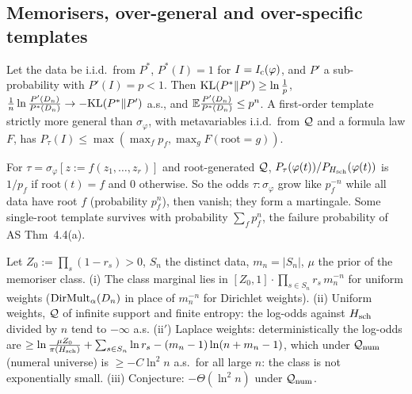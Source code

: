\subsection{Memorisers, over-general and over-specific templates}\label{sec:univ:memo}

\begin{theorem}\label{thm:univ:size}
Let the data be i.i.d.\ from $P^*$, $P^*(I)=1$ for $I=I_{\mathrm{c}}(\varphi)$, and $P'$ a sub-probability with $P'(I)=p<1$. Then $\mathrm{KL}(P^*\|P')\ge\ln\frac1p$, $\frac1n\ln\frac{P'(D_n)}{P^*(D_n)}\to-\mathrm{KL}(P^*\|P')$ a.s., and $\mathbb{E}\frac{P'(D_n)}{P^*(D_n)}\le p^n$. A first-order template strictly more general than $\sigma_\varphi$, with metavariables i.i.d.\ from $\mathcal{Q}$ and a formula law $F$, has $P_\tau(I)\le\max(\max_fp_f,\max_gF(\mathrm{root}=g))$.
\end{theorem}

\begin{proposition}\label{prop:univ:overspec}
For $\tau=\sigma_\varphi[z:=f(z_1,\dots,z_r)]$ and root-generated $\mathcal{Q}$, $P_\tau(\varphi(t))/P_{H_{\mathrm{sch}}}(\varphi(t))$ is $1/p_f$ if $\mathrm{root}(t)=f$ and $0$ otherwise. So the odds $\tau:\sigma_\varphi$ grow like $p_f^{-n}$ while all data have root $f$ (probability $p_f^n$), then vanish; they form a martingale. Some single-root template survives with probability $\sum_fp_f^n$, the failure probability of AS Thm~4.4(a).
\end{proposition}

\begin{proposition}[Memorisers]\label{prop:univ:memo}
Let $Z_0:=\prod_s(1-r_s)>0$, $S_n$ the distinct data, $m_n=\lvert S_n\rvert$, $\mu$ the prior of the memoriser class. \textup{(i)} The class marginal lies in $[Z_0,1]\cdot\prod_{s\in S_n}r_s\,m_n^{-n}$ for uniform weights ($\mathrm{DirMult}_\alpha(D_n)$ in place of $m_n^{-n}$ for Dirichlet weights). \textup{(ii)} Uniform weights, $\mathcal{Q}$ of infinite support and finite entropy: the log-odds against $H_{\mathrm{sch}}$ divided by $n$ tend to $-\infty$ a.s. \textup{(ii$'$)} Laplace weights: deterministically the log-odds are $\ge\ln\frac{\mu Z_0}{\pi(H_{\mathrm{sch}})}+\sum_{s\in S_n}\ln r_s-(m_n-1)\ln(n+m_n-1)$, which under $\mathcal{Q}_{\mathrm{num}}$ (numeral universe) is $\ge-C\ln^2n$ a.s.\ for all large $n$: the class is not exponentially small. \textup{(iii)} Conjecture: $-\Theta(\ln^2n)$ under $\mathcal{Q}_{\mathrm{num}}$.
\end{proposition}

